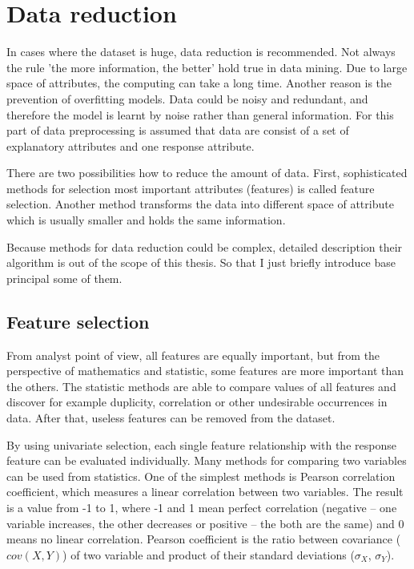 \documentclass[thesis=M,english]{FITthesis}[2012/10/20]
\begin{document}
\section{Data reduction}

In cases where the dataset is huge, data reduction is recommended. Not always the rule 'the more information, the better' hold true in data mining. Due to large space of attributes, the computing can take a long time. Another reason is the prevention of overfitting models. Data could be noisy and redundant, and therefore the model is learnt by noise rather than general information.\cite[43]{Chapman2000crisp} For this part of data preprocessing is assumed that data are consist of a set of explanatory attributes and one response attribute. 

There are two possibilities how to reduce the amount of data. First, sophisticated methods for selection most important attributes (features) is called feature selection. Another method transforms the data into different space of attribute which is usually smaller and holds the same information. 

Because methods for data reduction could be complex, detailed description their algorithm is out of the scope of this thesis. So that I just briefly introduce base principal some of them.

\subsection{Feature selection}

From analyst point of view, all features are equally important, but from the perspective of mathematics and statistic, some features are more important than the others. The statistic methods are able to compare values of all features and discover for example duplicity, correlation or other undesirable occurrences in data. After that, useless features can be removed from the dataset. 

By using univariate selection, each single feature relationship with the response feature can be evaluated individually. Many methods for comparing two variables can be used from statistics. One of the simplest methods is Pearson correlation coefficient, which measures a linear correlation between two variables. \cite{Saabas2014univariate}  The result is a value from -1 to 1, where -1 and 1 mean perfect correlation (negative -- one variable increases, the other decreases or positive -- the both are the same) and 0 means no linear correlation. Pearson coefficient is the ratio between covariance ($cov(X,Y)$) of two variable and product of their standard deviations ($\sigma_X$, $\sigma_Y$).
\end{document}
